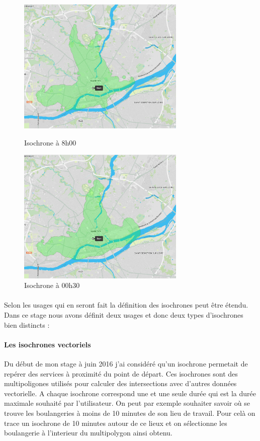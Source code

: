 \documentclass[a4paper]{report}
\begin{document}
\begin{figure}[H]
	\begin{minipage}[c]{.46\linewidth}
		\includegraphics[width=8cm]{image/iso_8h}
       		\caption{Isochrone à 8h00}
		\label{Isochrone à 8h00}
	\end{minipage} \hfill
	\begin{minipage}[c]{.46\linewidth}
		\includegraphics[width=8cm]{image/iso_00h30}
       		\caption{Isochrone à 00h30}
		\label{Isochrone à 00h30}
	\end{minipage}
\end{figure}

\paragraph{} Selon les usages qui en seront fait la définition des isochrones peut être étendu. Dans ce stage nous avons définit deux usages et donc deux types d'isochrones bien distincts : 

\paragraph{Les isochrones vectoriels} Du début de mon stage à juin 2016 j'ai considéré qu'un isochrone permetait de repérer des services à proximité du point de départ. Ces isochrones sont des multipoligones utilisés pour calculer des intersections avec d'autres données vectorielle. A chaque isochrone correspond une et une seule durée qui est la durée maximale souhaité par l'utilisateur. On peut par exemple souhaiter savoir où se trouve les boulangeries à moins de 10 minutes de son lieu de travail. Pour celà on trace un isochrone de 10 minutes autour de ce lieux et on sélectionne les boulangerie à l'interieur du multipolygon ainsi obtenu.
\end{document}
